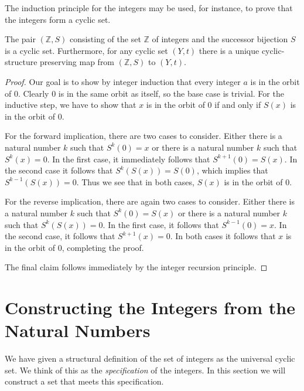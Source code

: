 The induction principle for the integers may be used, for instance, to prove that the integers form a cyclic set.

\begin{theorem}
  The pair $(\mathbb{Z},S)$ consisting of the set $\mathbb{Z}$ of integers and the successor bijection $S$ is a cyclic set. Furthermore, for any cyclic set $(Y,t)$ there is a unique cyclic-structure preserving map from $(\mathbb{Z},S)$ to $(Y,t)$.
\end{theorem}

\begin{proof}
  Our goal is to show by integer induction that every integer $a$ is in the orbit of $0$. Clearly $0$ is in the same orbit as itself, so the base case is trivial. For the inductive step, we have to show that $x$ is in the orbit of $0$ if and only if $S(x)$ is in the orbit of $0$.

  For the forward implication, there are two cases to consider. Either there is a natural number $k$ such that $S^k(0)=x$ or there is a natural number $k$ such that $S^k(x)=0$. In the first case, it immediately follows that $S^{k+1}(0)=S(x)$. In the second case it follows that $S^k(S(x))=S(0)$, which implies that $S^{k-1}(S(x))=0$. Thus we see that in both cases, $S(x)$ is in the orbit of $0$.

  For the reverse implication, there are again two cases to consider. Either there is a natural number $k$ such that $S^k(0)=S(x)$ or there is a natural number $k$ such that $S^k(S(x))=0$. In the first case, it follows that $S^{k-1}(0)=x$. In the second case, it follows that $S^{k+1}(x)=0$. In both cases it follows that $x$ is in the orbit of $0$, completing the proof.

  The final claim follows immediately by the integer recursion principle.
\end{proof}

\section{Constructing the Integers from the Natural Numbers}

We have given a structural definition of the set of integers as the universal cyclic set. We think of this as the \emph{specification} of the integers. In this section we will construct a set that meets this specification.

